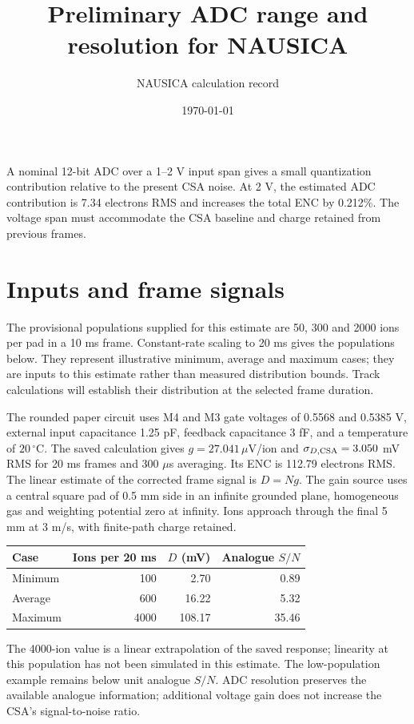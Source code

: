 \documentclass[11pt,a4paper]{article}
\title{Preliminary ADC range and resolution for NAUSICA}
\author{NAUSICA calculation record}\date{\today}
\begin{document}
\maketitle
A nominal 12-bit ADC over a 1--2 V input span gives a small quantization
contribution relative to the present CSA noise. At 2 V, the estimated ADC
contribution is 7.34 electrons RMS and increases the total ENC by
0.212\%. The voltage span must accommodate the CSA baseline and
charge retained from previous frames.

\section*{Inputs and frame signals}
The provisional populations supplied for this estimate are 50, 300 and
2000 ions per pad in a 10 ms frame. Constant-rate scaling to 20 ms gives
the populations below. They represent illustrative minimum, average and
maximum cases; they are inputs to this estimate rather than measured
distribution bounds. Track calculations will establish their distribution
at the selected frame duration.

The rounded paper circuit uses M4 and M3 gate voltages of 0.5568 and
0.5385 V, external input capacitance 1.25 pF, feedback capacitance 3 fF,
and a temperature of $20\,^{\circ}$C. The saved calculation gives
$g=27.041\,\mu$V/ion and $\sigma_{D,\rm CSA}=3.050$ mV RMS for
20 ms frames and 300 $\mu$s averaging. Its ENC is 112.79 electrons RMS.
The linear estimate of the corrected frame signal is $D=Ng$.
The gain source uses a central square pad of 0.5 mm side in an infinite
grounded plane, homogeneous gas and weighting potential zero at infinity.
Ions approach through the final 5 mm at 3 m/s, with finite-path charge retained.

\begin{center}\begin{tabular}{lrrr}\toprule
Case & Ions per 20 ms & $D$ (mV) & Analogue $S/N$\\\midrule
Minimum & 100 & 2.70 & 0.89 \\
Average & 600 & 16.22 & 5.32 \\
Maximum & 4000 & 108.17 & 35.46 \\
\bottomrule\end{tabular}\end{center}
The 4000-ion value is a linear extrapolation of the saved response;
linearity at this population has not been simulated in this estimate.
The low-population example remains below unit analogue $S/N$.
ADC resolution preserves the available analogue information; additional
voltage gain does not increase the CSA's signal-to-noise ratio.
\end{document}
